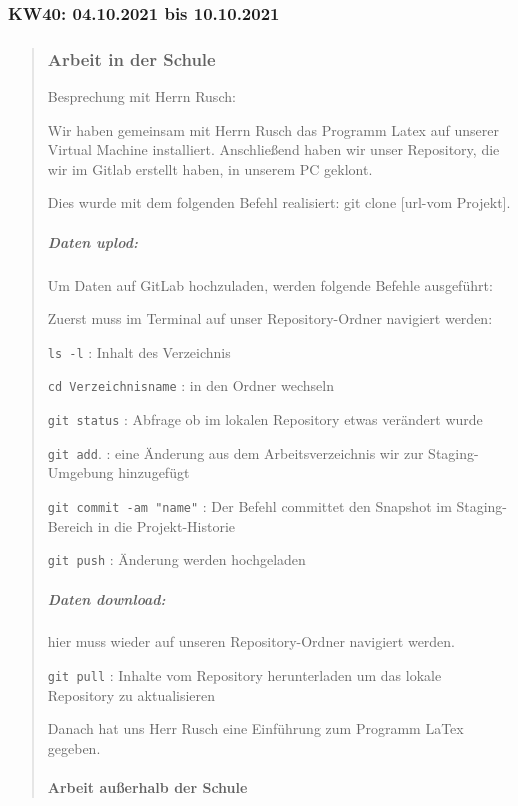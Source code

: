 

\subsubsection{KW40: 04.10.2021 bis 10.10.2021}
\begin{quote}
	\subsubsection*{Arbeit in der Schule}
	
	
	Besprechung mit Herrn Rusch:
	
	Wir haben gemeinsam mit Herrn Rusch das Programm Latex auf unserer
	Virtual Machine installiert. Anschließend haben wir unser Repository, die wir im Gitlab erstellt haben, in unserem PC geklont.
	
	Dies wurde mit dem folgenden Befehl realisiert: git clone {[}url-vom
	Projekt{]}.
	
	\subparagraph{\texorpdfstring{Daten uplod:
	}{Daten uplod: }}
	
	Um Daten auf GitLab hochzuladen, werden folgende Befehle ausgeführt:
	
	Zuerst muss im Terminal auf unser Repository-Ordner navigiert werden:
	
	\texttt{ls\ -l} : Inhalt des Verzeichnis
	
	\texttt{cd\ Verzeichnisname} : in den Ordner wechseln
	
	\texttt{git\ status} : Abfrage ob im lokalen Repository etwas verändert
	wurde
	
	\texttt{git\ add}. : eine Änderung aus dem Arbeitsverzeichnis wir zur
	Staging-Umgebung hinzugefügt
	
	\texttt{git\ commit\ -am\ "name"} : Der Befehl committet den Snapshot im
	Staging-Bereich in die Projekt-Historie
	
	\texttt{git\ push} : Änderung werden hochgeladen
	
	\subparagraph{Daten download:}
	
	hier muss wieder auf unseren Repository-Ordner navigiert werden.
	
	\texttt{git\ pull} : Inhalte vom Repository herunterladen um das lokale
	Repository zu aktualisieren
	
	Danach hat uns Herr Rusch eine Einführung zum Programm LaTex gegeben.
	
	
	\paragraph{Arbeit außerhalb der Schule}
	

\end{quote}
